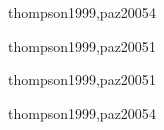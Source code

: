 \begin{syllabus}
\begin{unit}{\PFTWODef}{thompson1999,paz2005}{4}
   \begin{topics}
      \item \PFTWOTopicEstrategias
      \item \PFTWOTopicEl
      \item \PFTWOTopicEstrategiasde
      \item \PFTWOTopicEstrategiasdedepuracion
      \item \PFTWOTopicElConcepto
   \end{topics}
   \begin{learningoutcomes}
      \item \PFTWOObjONE
      \item \PFTWOObjTWO
      \item \PFTWOObjTHREE
      \item \PFTWOObjFOUR
   \end{learningoutcomes}
\end{unit}

\begin{unit}{\ALFIVEDef}{thompson1999,paz2005}{1}
   \begin{topics}
      \item \ALFIVETopicGramaticas
      \item \ALFIVETopicProblemas
      \item \ALFIVETopicFunciones
      \item \ALFIVETopicFunciones
   \end{topics}

   \begin{learningoutcomes}
      \item \ALFIVEObjFOUR
   \end{learningoutcomes}
\end{unit}

\begin{unit}{\PLTWODef}{thompson1999,paz2005}{1}

   \begin{topics}
      \item \PLTWOTopicEl
   \end{topics}

   \begin{learningoutcomes}
      \item \PLTWOObjONE
   \end{learningoutcomes}
\end{unit}

\begin{unit}{\PLSIXDef}{thompson1999,paz2005}{4}
   \begin{topics}
      \item \PLSIXTopicEncapsulacion
      \item \PLSIXTopicSeparacion
      \item \PLSIXTopicClases
      \item \PLSIXTopicPolimorfismo
      \item \PLSIXTopicJerarquias
   \end{topics}


\end{unit}
\end{syllabus}
